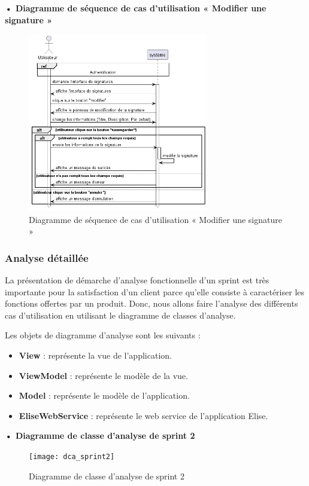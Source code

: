 \textbf{•	Diagramme de séquence de cas d'utilisation « Modifier une signature  »}
\begin{figure}[H]
  \centering
  \includegraphics[width=0.7\textwidth]{out/diagrams/signatures/update/update_signature}
  \caption{Diagramme de séquence de cas d'utilisation « Modifier une signature  »}
  \label{fig:sequence_update_signature}
\end{figure}

\subsubsection{Analyse détaillée}
La présentation de démarche d'analyse fonctionnelle d'un sprint est très importante pour la satisfaction d'un client parce qu'elle consiste à caractériser les fonctions offertes par un produit.
Donc, nous allons faire l'analyse des différents cas d'utilisation en utilisant le diagramme de classes d'analyse.

Les objets de diagramme d'analyse sont les suivants :
\begin{itemize}
  \item \textbf{View} : représente la vue de l'application.
  \item \textbf{ViewModel} : représente le modèle de la vue.
  \item \textbf{Model} : représente le modèle de l'application.
  \item \textbf{EliseWebService} : représente le web service de l'application Elise.
\end{itemize}

\newpage

\textbf{•	Diagramme de classe d'analyse de sprint 2 }
\begin{figure}
  \centering
  \texttt{[image: dca\_sprint2]}
  \caption{Diagramme de classe d'analyse de sprint 2}
  \label{fig:class_analyse_signatures}
\end{figure}


